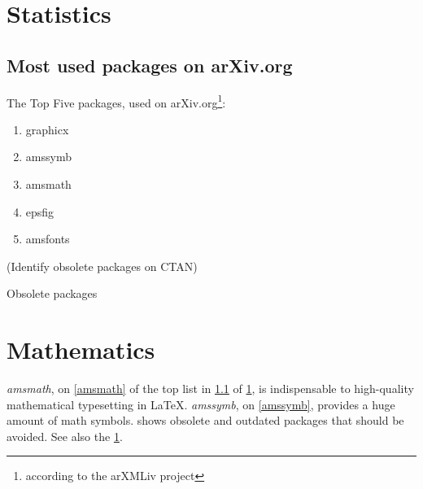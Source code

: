 \documentclass{book}
\begin{document}
\chapter{Statistics}\label{stats}
\section{Most used packages on arXiv.org}\label{packages}
The Top Five packages, used on arXiv.org\footnote{according
to the arXMLiv project\label{project}}:
\begin{enumerate}
  \item graphicx
  \item amssymb \label{amssymb}
  \item amsmath \label{amsmath}
  \item epsfig
  \item amsfonts
\end{enumerate}
\begin{table}[tp]
  \centering
  (Identify obsolete packages on CTAN)
  \caption{Obsolete packages}\label{obsolete}
\end{table}
\chapter{Mathematics}
\emph{amsmath}, on \cref{amsmath} of the top list in
\cref{packages} of \cref{stats}, is indispensable to high-quality
mathematical typesetting in \LaTeX. \emph{amssymb}, on
\cref{amssymb}, provides a huge amount of math symbols.
 shows obsolete and outdated packages that
should be avoided. See also the \cref{project}.
\end{document}
